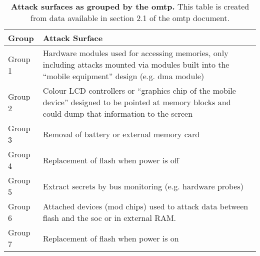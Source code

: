 \begin{table}[htbp]
\centering
\begin{tabular}{|p{2cm}|p{12cm}|}
\hline
\textbf{Group} & \textbf{Attack Surface} \\ \hline
Group 1 & Hardware modules used for accessing memories, only including attacks mounted via modules built into the ``mobile equipment'' design (e.g. \gls{dma} module) \\ \hline
Group 2 & Colour LCD controllers or ``graphics chip of the mobile device'' designed to be pointed at memory blocks and could dump that information to the screen\\ \hline
Group 3 & Removal of battery or external memory card \\ \hline
Group 4 & Replacement of flash when power is off \\ \hline
Group 5 & Extract secrets by bus monitoring (e.g. hardware probes) \\ \hline
Group 6 & Attached devices (mod chips) used to attack data between flash and the \gls{soc} or in external RAM. \\ \hline
Group 7 & Replacement of flash when power is on \\ \hline
\end{tabular}
\caption[OMTP Threat Groups]{\textbf{Attack surfaces as grouped by the \gls{omtp}.} This table is created from data available in section 2.1 of the \gls{omtp} document. \cite{Confidential2009}}
\label{table:omtp_threat_groups}
\end{table}
